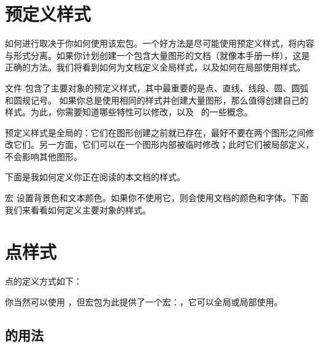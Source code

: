 \section{预定义样式}\label{custom}
如何进行取决于你如何使用该宏包。一个好方法是尽可能使用预定义样式，将内容与形式分离。如果你计划创建一个包含大量图形的文档（就像本手册一样），这是正确的方法。我们将看到如何为文档定义全局样式，以及如何在局部使用样式。

文件  包含了主要对象的预定义样式，其中最重要的是点、直线、线段、圆、圆弧和圆规记号。
 如果你总是使用相同的样式并创建大量图形，那么值得创建自己的样式。为此，你需要知道哪些特性可以修改，以及 \TIKZ\ 的一些概念。
 
 预定义样式是全局的：它们在图形创建之前就已存在，最好不要在两个图形之间修改它们。另一方面，它们可以在一个图形内部被临时修改；此时它们被局部定义，不会影响其他图形。
 
 下面是我如何定义你正在阅读的本文档的样式。

\begin{tkzltxexample}[]
  \tkzSetUpColors[background=white,text=black]  
  \tkzSetUpPoint[size=2,color=teal]
  \tkzSetUpLine[line width=.4pt,color=teal]
  \tkzSetUpCompass[color=orange, line width=.4pt,delta=10]
  \tkzSetUpArc[color=gray,line width=.4pt]
\end{tkzltxexample}

宏  设置背景色和文本颜色。如果你不使用它，则会使用文档的颜色和字体。下面我们来看看如何定义主要对象的样式。

\section{点样式}
点的定义方式如下：
\begin{tkzltxexample}[]
\end{tkzltxexample}

你当然可以使用 ，但宏包为此提供了一个宏：，它可以全局或局部使用。

\subsection{ 的用法}

